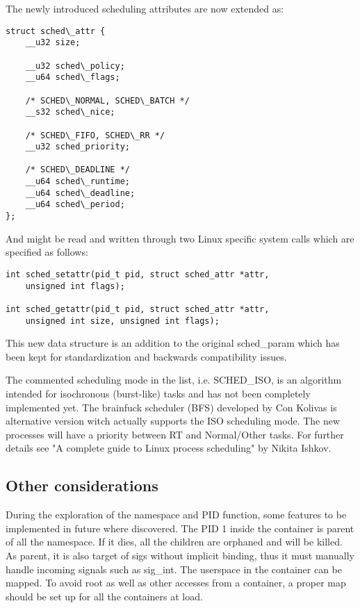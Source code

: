 \documentclass[]{scrartcl}
\begin{document}
The newly introduced scheduling attributes are now extended as:

\begin{verbatim}
struct sched\_attr {
    __u32 size;
    
    __u32 sched\_policy;
    __u64 sched\_flags;
    
    /* SCHED\_NORMAL, SCHED\_BATCH */
    __s32 sched\_nice;
    
    /* SCHED\_FIFO, SCHED\_RR */
    __u32 sched_priority;
    
    /* SCHED\_DEADLINE */
    __u64 sched\_runtime;
    __u64 sched\_deadline;
    __u64 sched\_period;
};
\end{verbatim}

And might be read and written through two Linux specific system calls which are specified as follows:


\begin{verbatim}
int sched_setattr(pid_t pid, struct sched_attr *attr,
    unsigned int flags);

int sched_getattr(pid_t pid, struct sched_attr *attr,
    unsigned int size, unsigned int flags);
\end{verbatim}

This new data structure is an addition to the original sched\_param which has been kept for standardization and backwards compatibility issues.

The commented scheduling mode in the list, i.e. SCHED\_ISO, is an algorithm intended for isochronous (burst-like) tasks and has not been completely implemented yet. 
The brainfuck scheduler (BFS) developed by Con Kolivas is alternative version witch actually supports the ISO scheduling mode. The new processes will have a priority between RT and Normal/Other tasks.
For further details see "A complete guide to Linux process scheduling"  by Nikita Ishkov.

\subsection{Other considerations}

During the exploration of the namespace and PID function, some features to be implemented in future where discovered. 
The PID 1 inside the container is parent of all the namespace. If it dies, all the children are orphaned and will be killed. As parent, it is also target of sigs without implicit binding, thus it must manually handle incoming signals such as sig\_int.
The userspace in the container can be mapped. To avoid root as well as other accesses from a container, a proper map should be set up for all the containers at load.
\end{document}
